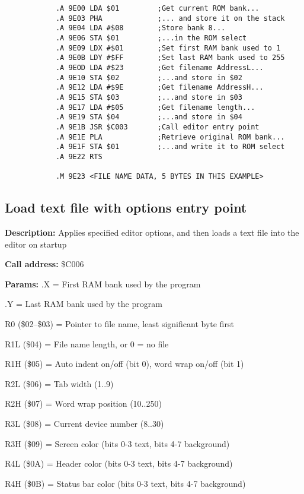 \documentclass{article}
\begin{document}
        \begin{verbatim}
            .A 9E00 LDA $01         ;Get current ROM bank...
            .A 9E03 PHA             ;... and store it on the stack
            .A 9E04 LDA #$08        ;Store bank 8...
            .A 9E06 STA $01         ;...in the ROM select
            .A 9E09 LDX #$01        ;Set first RAM bank used to 1
            .A 9E0B LDY #$FF        ;Set last RAM bank used to 255
            .A 9EOD LDA #$23        ;Get filename AddressL...
            .A 9E10 STA $02         ;...and store in $02
            .A 9E12 LDA #$9E        ;Get filename AddressH...
            .A 9E15 STA $03         ;...and store in $03
            .A 9E17 LDA #$05        ;Get filename length...
            .A 9E19 STA $04         ;...and store in $04
            .A 9E1B JSR $C003       ;Call editor entry point
            .A 9E1E PLA             ;Retrieve original ROM bank...
            .A 9E1F STA $01         ;...and write it to ROM select
            .A 9E22 RTS

            .M 9E23 <FILE NAME DATA, 5 BYTES IN THIS EXAMPLE>
        \end{verbatim}    

\subsection{Load text file with options entry point}

        \begin{hangparas}{3cm}{1}

            \textbf{Description:} \tabto{3cm} Applies specified editor options, and then loads a text file into the editor on startup

            \textbf{Call address:} \tabto{3cm}\$C006

            \textbf{Params:} \tabto{3cm}.X = First RAM bank used by the program
        
            \tabto{3cm} .Y = Last RAM bank used by the program

            \tabto{3cm} R0 (\$02--\$03) = Pointer to file name, least significant byte first

            \tabto{3cm} R1L (\$04) = File name length, or 0 = no file

            \tabto{3cm} R1H (\$05) = Auto indent on/off (bit 0), word wrap on/off (bit 1)

            \tabto{3cm} R2L (\$06) = Tab width (1..9)

            \tabto{3cm} R2H (\$07) = Word wrap position (10..250)

            \tabto{3cm} R3L (\$08) = Current device number (8..30)

            \tabto{3cm} R3H (\$09) = Screen color (bits 0-3 text, bits 4-7 background)

            \tabto{3cm} R4L (\$0A) = Header color (bits 0-3 text, bits 4-7 background)

            \tabto{3cm} R4H (\$0B) = Status bar color (bits 0-3 text, bits 4-7 background)

        \end{hangparas}
\end{document}
